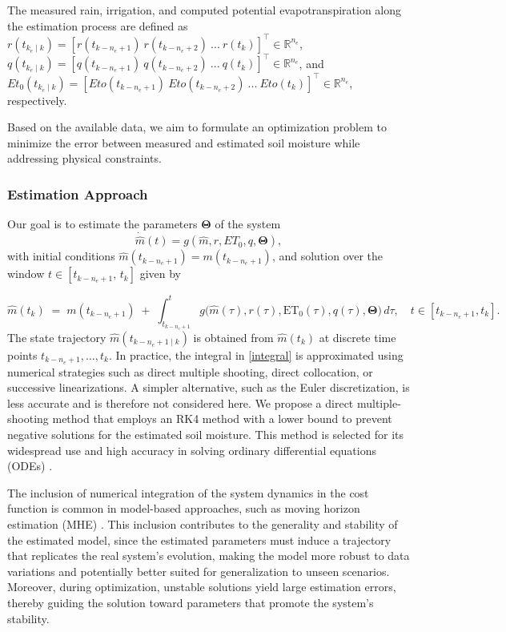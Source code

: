 \documentclass[pdflatex,sn-nature]{sn-jnl}%
\theoremstyle{thmstyleone}%
\theoremstyle{thmstyletwo}%
\theoremstyle{thmstylethree}%
\begin{document}
The measured rain, irrigation, and computed potential evapotranspiration along the estimation process are defined as 
${r(t_{k_e \mid k})}=\left[r(t_{k-n_e +1}) \ r(t_{k-n_e +2}) \ ...\ r(t_{k}) \right]^\top \in \mathbb{R}^{n_e}$, 
${q(t_{k_e \mid k})}=\left[q(t_{k-n_e +1}) \ q(t_{k-n_e +2}) \ ...\ q(t_{k}) \right]^\top \in \mathbb{R}^{n_e}$,
and 
${Et_0 (t_{k_e \mid k})}=\left[Eto (t_{k-n_e +1}) \ Eto (t_{k-n_e +2}) \ ...\ Eto (t_{k}) \right]^\top \in \mathbb{R}^{n_e}$, 
respectively. 

Based on the available data, we aim to formulate an optimization problem to minimize the error between measured and estimated soil moisture while addressing physical constraints.

\subsubsection{Estimation Approach}
Our goal is to estimate the parameters $\boldsymbol{\Theta}$ of the system 
\begin{equation}
    \dot{\hat{m}}(t) = g(\hat{m},r,ET_0,q,\boldsymbol{\Theta}),
\end{equation}
with initial conditions \(\hat{m}(t_{k-n_e+1}) = m(t_{k-n_e+1})\), and solution over the window \(t\in[t_{k-n_e+1},\,t_k]\) given by

\begin{equation}
\label{integral}
    \hat{m}(t_k)
  \;=\;
  m(t_{k-n_e+1})\;+\;
  \int_{t_{k-n_e+1}}^{t}
        g\!\bigl(
            \hat{m}(\tau),
            r(\tau),
            \mathrm{ET_0}(\tau),
            q(\tau),
            \boldsymbol{\Theta}
          \bigr)\, d\tau,
  \quad t\in[t_{k-n_e+1},t_k].
\end{equation}
The state trajectory $ \hat{m}(t_{k - n_e + 1 \mid k}) $ is obtained from $ \hat{m}(t_k) $ at discrete time points $ t_{k - n_e + 1}, \dots, t_k $. In practice, the integral in \eqref{integral} is approximated using numerical strategies such as direct multiple shooting, direct collocation, or successive linearizations. A simpler alternative, such as the Euler discretization, is less accurate and is therefore not considered here. We propose a direct multiple-shooting method that employs an RK4 method with a lower bound to prevent negative solutions for the estimated soil moisture. This method is selected for its widespread use and high accuracy in solving ordinary differential equations (ODEs) \cite{rawlings2017}. 

The inclusion of numerical integration of the system dynamics in the cost function is common in model-based approaches, such as moving horizon estimation (MHE) \cite{rawlings2017}. This inclusion contributes to the generality and stability of the estimated model, since the estimated parameters must induce a trajectory that replicates the real system’s evolution, making the model more robust to data variations and potentially better suited for generalization to unseen scenarios. Moreover, during optimization, unstable solutions yield large estimation errors, thereby guiding the solution toward parameters that promote the system's stability. 
\end{document}
